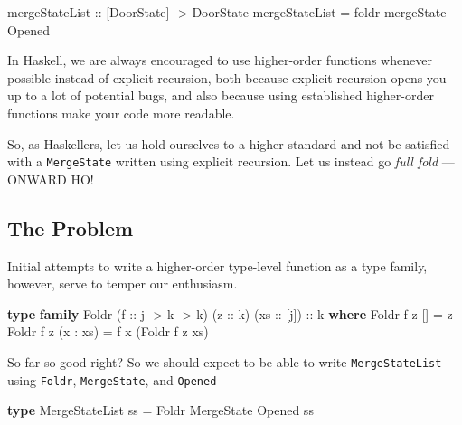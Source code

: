 \documentclass[]{article}
\newenvironment{Shaded}{}{}
\newcommand{\DataTypeTok}[1]{\textcolor[rgb]{0.56,0.13,0.00}{#1}}
\newcommand{\FunctionTok}[1]{\textcolor[rgb]{0.02,0.16,0.49}{#1}}
\newcommand{\KeywordTok}[1]{\textcolor[rgb]{0.00,0.44,0.13}{\textbf{#1}}}
\newcommand{\NormalTok}[1]{#1}
\newcommand{\OperatorTok}[1]{\textcolor[rgb]{0.40,0.40,0.40}{#1}}
\newcommand{\OtherTok}[1]{\textcolor[rgb]{0.00,0.44,0.13}{#1}}
\begin{document}
\begin{Shaded}
\begin{Highlighting}[]
\OtherTok{mergeStateList ::}\NormalTok{ [}\DataTypeTok{DoorState}\NormalTok{] }\OtherTok{{-}\textgreater{}} \DataTypeTok{DoorState}
\NormalTok{mergeStateList }\OtherTok{=} \FunctionTok{foldr}\NormalTok{ mergeState }\DataTypeTok{Opened}
\end{Highlighting}
\end{Shaded}

In Haskell, we are always encouraged to use higher-order functions whenever
possible instead of explicit recursion, both because explicit recursion opens
you up to a lot of potential bugs, and also because using established
higher-order functions make your code more readable.

So, as Haskellers, let us hold ourselves to a higher standard and not be
satisfied with a \texttt{MergeState} written using explicit recursion. Let us
instead go \emph{full fold} --- ONWARD HO!

\subsection{The Problem}\label{the-problem}

Initial attempts to write a higher-order type-level function as a type family,
however, serve to temper our enthusiasm.

\begin{Shaded}
\begin{Highlighting}[]
\KeywordTok{type} \KeywordTok{family} \DataTypeTok{Foldr}\NormalTok{ (}\OtherTok{f ::}\NormalTok{ j }\OtherTok{{-}\textgreater{}}\NormalTok{ k }\OtherTok{{-}\textgreater{}}\NormalTok{ k) (}\OtherTok{z ::}\NormalTok{ k) (}\OtherTok{xs ::}\NormalTok{ [j])}\OtherTok{ ::}\NormalTok{ k }\KeywordTok{where}
    \DataTypeTok{Foldr}\NormalTok{ f z \textquotesingle{}[]       }\OtherTok{=}\NormalTok{ z}
    \DataTypeTok{Foldr}\NormalTok{ f z (x \textquotesingle{}}\OperatorTok{:}\NormalTok{ xs) }\OtherTok{=}\NormalTok{ f x (}\DataTypeTok{Foldr}\NormalTok{ f z xs)}
\end{Highlighting}
\end{Shaded}

So far so good right? So we should expect to be able to write
\texttt{MergeStateList} using \texttt{Foldr}, \texttt{MergeState}, and
\texttt{\textquotesingle{}Opened}

\begin{Shaded}
\begin{Highlighting}[]
\KeywordTok{type} \DataTypeTok{MergeStateList}\NormalTok{ ss }\OtherTok{=} \DataTypeTok{Foldr} \DataTypeTok{MergeState} \DataTypeTok{\textquotesingle{}Opened}\NormalTok{ ss}
\end{Highlighting}
\end{Shaded}
\end{document}
